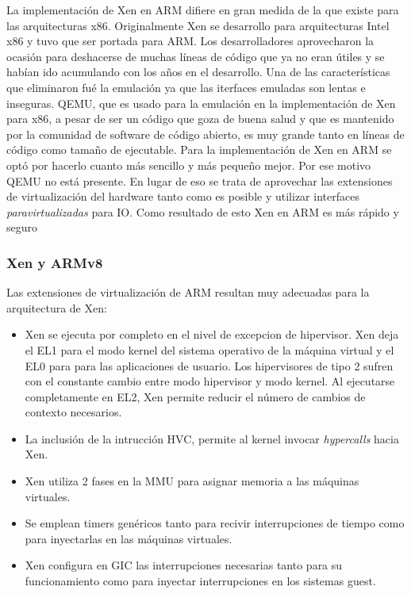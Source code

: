 La implementación de Xen en ARM difiere en gran medida de la que existe para las arquitecturas x86. Originalmente Xen se desarrollo para arquitecturas Intel x86 y tuvo que ser portada para ARM. Los desarrolladores aprovecharon la ocasión para deshacerse de muchas líneas de código que ya no eran útiles y se habían ido acumulando con los años en el desarrollo. Una de las características que eliminaron fué la emulación ya que las iterfaces emuladas son lentas e inseguras. QEMU, que es usado para la emulación en la implementación de Xen para x86, a pesar de ser un código que goza de buena salud y que es mantenido por la comunidad de software de código abierto, es muy grande tanto en líneas de código como tamaño de ejecutable. Para la implementación de Xen en ARM se optó por hacerlo cuanto más sencillo y más pequeño mejor. Por ese motivo QEMU no está presente. En lugar de eso se trata de aprovechar las extensiones de virtualización del hardware tanto como es posible y utilizar interfaces \textit{paravirtualizadas} para IO. Como resultado de esto Xen en ARM es más rápido y seguro \cite{xen_arm_whitepaper}

\subsubsection{Xen y ARMv8}

Las extensiones de virtualización de ARM resultan muy adecuadas para la arquitectura de Xen:
\begin{itemize}
  \item Xen se ejecuta por completo en el nivel de excepcion de hipervisor.  Xen deja el EL1 para el modo kernel del sistema operativo de la máquina virtual y el EL0 para para las aplicaciones de usuario. Los hipervisores de tipo 2 sufren con el constante cambio entre modo hipervisor y modo kernel. Al ejecutarse completamente en EL2, Xen permite reducir el número de cambios de contexto necesarios.
  \item La inclusión de la intrucción HVC, permite al kernel invocar \textit{hypercalls} hacia Xen.
  \item Xen utiliza 2 fases en la MMU para asignar memoria a las máquinas virtuales.
  \item Se emplean timers genéricos tanto para recivir interrupciones de tiempo como para inyectarlas en las máquinas virtuales.
  \item Xen configura en GIC las interrupciones necesarias tanto para su funcionamiento como para inyectar interrupciones en los sistemas guest.
\end{itemize}

